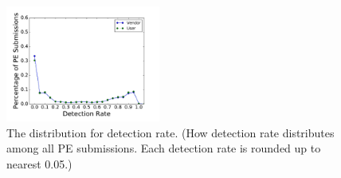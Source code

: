\begin{figure}[t!]
\begin{center}
\includegraphics[width=2in]{figure/DetectionRate}
\caption{The distribution for detection rate.
(How detection rate distributes among all PE submissions. 
Each detection rate is rounded up to nearest 0.05.)
}
\label{fig:detectiorate}
\end{center}
\end{figure}